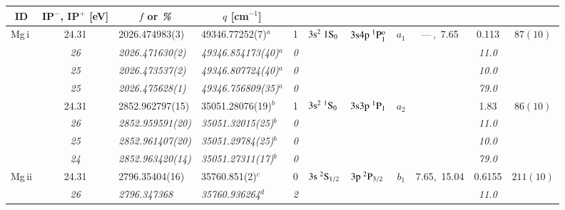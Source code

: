 \documentclass[useAMS,usenatbib]{mn2e}
\begin{document}
\begin{table*}
\begin{center}
\begin{minipage}{0.977\textwidth}
\begin{tabular}{lcllcllcccc}
\multicolumn{1}{c}{ID}&\multicolumn{1}{c}{IP$^-$, IP$^+$ [eV]}&
\multicolumn{1}{c}{$f$
or {\it \%}}&\multicolumn{1}{c}{$q$ [cm$^{-1}$]}\\\hline
Mg{\sc \,i}   & 24.31  & 2026.474983(3)     & 49346.77252(7)$^a$       & 1    & $3\rm{s}^2~1\rm{S}_0$                      & $3\rm{s}4\rm{p}~^1\rm{P}_1^{\rm{o}}$               & $a_1$  & ---\,,~7.65  &  0.113  & $   87(10) $\\
              & \it{26}&\it{2026.471630(2)} &\it{49346.854173(40)}$^a$ &\it{0}&                                            &                                                    &        &              &\it{11.0}& $          $\\
              & \it{25}&\it{2026.473537(2)} &\it{49346.807724(40)}$^a$ &\it{0}&                                            &                                                    &        &              &\it{10.0}& $          $\\
              & \it{25}&\it{2026.475628(1)} &\it{49346.756809(35)}$^a$ &\it{0}&                                            &                                                    &        &              &\it{79.0}& $          $\\
              & 24.31  & 2852.962797(15)    & 35051.28076(19)$^b$      & 1    & $3\rm{s}^2~^1\rm{S}_0$                     & $3\rm{s}3\rm{p}~^1\rm{P}_1$                        & $a_2$  &              &  1.83   & $   86(10) $\\
              & \it{26}&\it{2852.959591(20)}&\it{35051.32015(25)}$^b$  &\it{0}&                                            &                                                    &        &              &\it{11.0}& $          $\\
              & \it{25}&\it{2852.961407(20)}&\it{35051.29784(25)}$^b$  &\it{0}&                                            &                                                    &        &              &\it{10.0}& $          $\\
              & \it{24}&\it{2852.963420(14)}&\it{35051.27311(17)}$^b$  &\it{0}&                                            &                                                    &        &              &\it{79.0}& $          $\\
Mg{\sc \,ii}  & 24.31  & 2796.35404(16)     & 35760.851(2)$^c$         & 0    & $3\rm{s}~^2\rm{S}_{1/2}$                   & $3\rm{p}~^2\rm{P}_{3/2}$                           & $b_1$  & 7.65,~15.04  &  0.6155 & $  211(10) $\\
              & \it{26}&\it{2796.347368}    &\it{35760.936264}$^d$     &\it{2}&                                            &                                                    &        &              &\it{11.0}& $          $\\

\end{tabular}
\end{minipage}
\end{center}
\end{table*}
\end{document}
